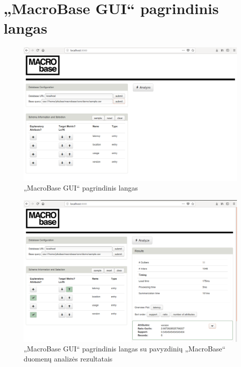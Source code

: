 \documentclass{VUMIFPSkursinis}
\begin{document}
\section{„MacroBase GUI“ pagrindinis langas} \label{sec:gui}
\begin{figure}[H]
    \centering
    \includegraphics[scale=0.33]{img/gui}
    \caption{„MacroBase GUI“ pagrindinis langas}
    \label{img:gui}
\end{figure}
\begin{figure}[H]
    \centering
    \includegraphics[scale=0.33]{img/gui2}
    \caption{„MacroBase GUI“ pagrindinis langas su pavyzdinių „MacroBase“ duomenų analizės rezultatais}
    \label{img:gui2}
\end{figure}
\end{document}
